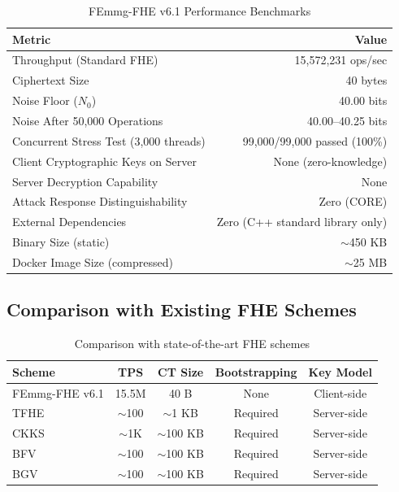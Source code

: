 \documentclass{article}
\begin{document}
\begin{table}[H]
\centering
\begin{tabular}{|l|r|}
\hline
\textbf{Metric} & \textbf{Value} \\
\hline
Throughput (Standard FHE) & 15,572,231 ops/sec \\
Ciphertext Size & 40 bytes \\
Noise Floor ($N_0$) & 40.00 bits \\
Noise After 50,000 Operations & 40.00--40.25 bits \\
Concurrent Stress Test (3,000 threads) & 99,000/99,000 passed (100\%) \\
Client Cryptographic Keys on Server & None (zero-knowledge) \\
Server Decryption Capability & None \\
Attack Response Distinguishability & Zero (CORE) \\
External Dependencies & Zero (C++ standard library only) \\
Binary Size (static) & $\sim$450 KB \\
Docker Image Size (compressed) & $\sim$25 MB \\
\hline
\end{tabular}
\caption{FEmmg-FHE v6.1 Performance Benchmarks}
\end{table}

\subsection{Comparison with Existing FHE Schemes}

\begin{table}[H]
\centering
\begin{tabular}{|l|c|c|c|c|}
\hline
\textbf{Scheme} & \textbf{TPS} & \textbf{CT Size} & \textbf{Bootstrapping} & \textbf{Key Model} \\
\hline
FEmmg-FHE v6.1 & 15.5M & 40 B & None & Client-side \\
TFHE \cite{chillotti2020} & $\sim$100 & $\sim$1 KB & Required & Server-side \\
CKKS \cite{cheon2017} & $\sim$1K & $\sim$100 KB & Required & Server-side \\
BFV \cite{fan2012} & $\sim$100 & $\sim$100 KB & Required & Server-side \\
BGV \cite{brakerski2014} & $\sim$100 & $\sim$100 KB & Required & Server-side \\
\hline
\end{tabular}
\caption{Comparison with state-of-the-art FHE schemes}
\end{table}
\end{document}

